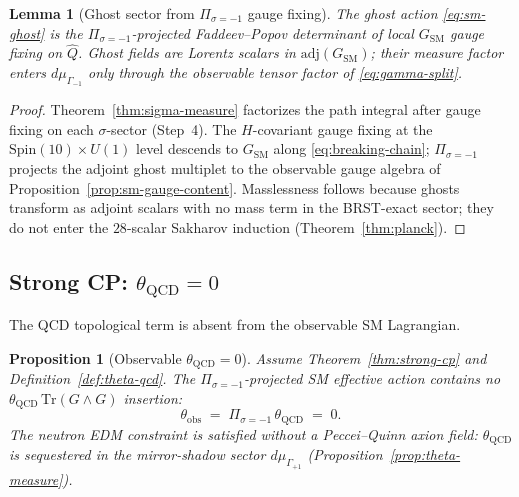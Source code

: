 \documentclass[aps,prd,onecolumn,amsmath,amssymb,nofootinbib,11pt]{revtex4-2}
\numberwithin{equation}{section}
\theoremstyle{plain}
\newtheorem{lemma}[theorem]{Lemma}
\newtheorem{proposition}[theorem]{Proposition}
\theoremstyle{definition}
\theoremstyle{remark}
\newcommand{\Spin}{\mathrm{Spin}}
\begin{document}
\begin{lemma}[Ghost sector from $\Pi_{\sigma=-1}$ gauge fixing]
\label{lem:sm-ghost-derived}
The ghost action \eqref{eq:sm-ghost} is the $\Pi_{\sigma=-1}$-projected
Faddeev--Popov determinant of local $G_{\mathrm{SM}}$ gauge fixing on
$\hat Q$. Ghost fields are Lorentz scalars in $\mathrm{adj}(G_{\mathrm{SM}})$;
their measure factor enters $d\mu_{\Gamma_{-1}}$ only through the observable
tensor factor of \eqref{eq:gamma-split}.
\end{lemma}

\begin{proof}
Theorem~\ref{thm:sigma-measure} factorizes the path integral after gauge
fixing on each $\sigma$-sector (Step~4). The $H$-covariant gauge fixing at the
$\Spin(10)\times U(1)$ level descends to $G_{\mathrm{SM}}$ along
\eqref{eq:breaking-chain}; $\Pi_{\sigma=-1}$ projects the adjoint ghost
multiplet to the observable gauge algebra of
Proposition~\ref{prop:sm-gauge-content}. Masslessness follows because ghosts
transform as adjoint scalars with no mass term in the BRST-exact sector; they
do not enter the $28$-scalar Sakharov induction (Theorem~\ref{thm:planck}).
\end{proof}

\subsection{Strong CP: $\theta_{\mathrm{QCD}}=0$}
\label{sec:sm-lagrangian:theta}

The QCD topological term is absent from the observable SM Lagrangian.

\begin{proposition}[Observable $\theta_{\mathrm{QCD}}=0$]
\label{prop:sm-theta-zero}
Assume Theorem~\ref{thm:strong-cp} and Definition~\ref{def:theta-qcd}. The
$\Pi_{\sigma=-1}$-projected SM effective action contains no
$\theta_{\mathrm{QCD}}\,\mathrm{Tr}(G\wedge G)$ insertion:
\begin{equation}\label{eq:sm-theta-zero}
  \theta_{\mathrm{obs}}
  \;=\;
  \Pi_{\sigma=-1}\,\theta_{\mathrm{QCD}}
  \;=\;
  0.
\end{equation}
The neutron EDM constraint is satisfied without a Peccei--Quinn axion field:
$\theta_{\mathrm{QCD}}$ is sequestered in the mirror-shadow sector
$d\mu_{\Gamma_{+1}}$ (Proposition~\ref{prop:theta-measure}).
\end{proposition}
\end{document}
